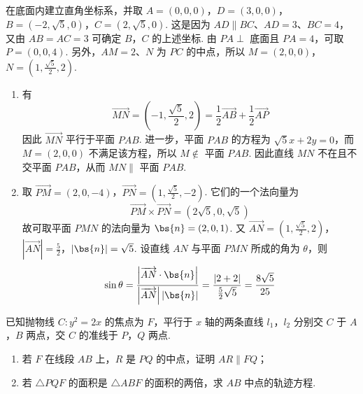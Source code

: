 \begin{solution}
在底面内建立直角坐标系，并取
\(A=(0,0,0)\)，\(D=(3,0,0)\)，\(B=(-2,\sqrt5,0)\)，\(C=(2,\sqrt5,0)\).
这是因为 \(AD\parallel BC\)、\(AD=3\)、\(BC=4\)，又由 \(AB=AC=3\) 可确定 \(B\)，\(C\) 的上述坐标. 由 \(PA\perp\) 底面且 \(PA=4\)，可取 \(P=(0,0,4)\). 另外，\(AM=2\)、\(N\) 为 \(PC\) 的中点，所以
\(M=(2,0,0)\)，\(N=\left(1,\frac{\sqrt5}{2},2\right)\).

\begin{enumerate}
\item 有
\[
\overrightarrow{MN}=\left(-1,\frac{\sqrt5}{2},2\right)=\frac12\overrightarrow{AB}+\frac12\overrightarrow{AP}
\]
因此 \(\overrightarrow{MN}\) 平行于平面 \(PAB\). 进一步，平面 \(PAB\) 的方程为 \(\sqrt5x+2y=0\)，而 \(M=(2,0,0)\) 不满足该方程，所以 \(M\notin\) 平面 \(PAB\). 因此直线 \(MN\) 不在且不交平面 \(PAB\)，从而 \(MN\parallel\) 平面 \(PAB\).

\item 取
\(\overrightarrow{PM}=(2,0,-4)\)，\(\overrightarrow{PN}=\left(1,\frac{\sqrt5}{2},-2\right)\).
它们的一个法向量为
\[
\overrightarrow{PM}\times\overrightarrow{PN}=(2\sqrt5,0,\sqrt5)
\]
故可取平面 \(PMN\) 的法向量为 \(\bs{n}=(2,0,1)\). 又
\(\overrightarrow{AN}=\left(1,\frac{\sqrt5}{2},2\right)\)，\(\left|\overrightarrow{AN}\right|=\frac52\)，\(|\bs{n}|=\sqrt5\).
设直线 \(AN\) 与平面 \(PMN\) 所成的角为 \(\theta\)，则
\[
\sin\theta=\frac{\left|\overrightarrow{AN}\cdot\bs{n}\right|}{\left|\overrightarrow{AN}\right||\bs{n}|}=\frac{|2+2|}{\frac52\sqrt5}=\frac{8\sqrt5}{25}
\]
\end{enumerate}
\end{solution}

\begin{problem}
已知抛物线 \(C:y^2=2x\) 的焦点为 \(F\)，平行于 \(x\) 轴的两条直线 \(l_1\)，\(l_2\) 分别交 \(C\) 于 \(A\)，\(B\) 两点，交 \(C\) 的准线于 \(P\)，\(Q\) 两点.

\begin{enumerate}
\item 若 \(F\) 在线段 \(AB\) 上，\(R\) 是 \(PQ\) 的中点，证明 \(AR\parallel FQ\)；
\item 若 \(\triangle PQF\) 的面积是 \(\triangle ABF\) 的面积的两倍，求 \(AB\) 中点的轨迹方程.
\end{enumerate}
\end{problem}

